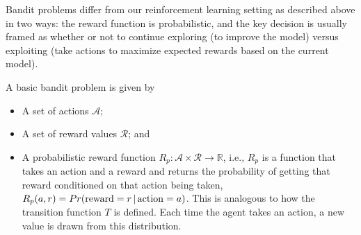 Bandit problems differ from our reinforcement learning setting as
described above in two ways: the reward function is probabilistic, and
the key decision is usually framed as whether or not to continue
exploring (to improve the model) versus exploiting (take actions to
maximize expected rewards based on the current model).

A basic bandit problem is given by
\begin{itemize}
  \item A set of actions $\mathcal{A}$;
  \item A set of reward values $\mathcal{R}$; and
  \item A probabilistic reward function $R_p: {\mathcal{A}} \times
          {\mathcal{R}} \rightarrow \mathbb{R}$, i.e., $R_p$ is a function that
        takes an action and a reward and returns the probability of getting
        that reward conditioned on that action being taken, $R_p(a, r) =
          Pr({\rm reward} = r \, |\, {\rm action} = a)$.  This is analogous to
        how the transition function $T$ is defined.  Each time the agent
        takes an action, a new value is drawn from this distribution.
\end{itemize}


